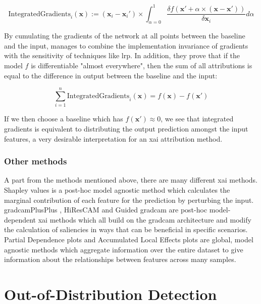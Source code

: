 \documentclass[UKenglish]{uiomasterthesis} %
\theoremstyle{definition}
\begin{document}
\begin{equation}
    \text{IntegratedGradients}_i(\mathbf{x}) := (\mathbf{x}_i - \mathbf{x}_i') \times \int_{\alpha = 0}^1 \frac{\delta f(\mathbf{x}' + \alpha \times (\mathbf{x} - \mathbf{x}'))}{\delta \mathbf{x}_i}d\alpha
\end{equation}

By cumulating the gradients of the network at all points between the baseline and the input, \cite{integratedgradients} manages to combine the implementation invariance of gradients with the sensitivity of techniques like \ac{lrp}. In addition, they prove that if the model $f$ is differentiable "almost everywhere", then the sum of all attributions is equal to the difference in output between the baseline and the input:

\begin{equation}
    \sum_{i=1}^n \text{IntegratedGradients}_i(\mathbf{x}) = f(\mathbf{x}) - f(\mathbf{x'})
\end{equation}

If we then choose a baseline which has $f(\mathbf{x'}) \approx 0$, we see that integrated gradients is equivalent to distributing the output prediction amongst the input features, a very desirable interpretation for an \ac{xai} attribution method.

\subsubsection{Other methods}

A part from the methods mentioned above, there are many different \ac{xai} methods. Shapley values \cite{shapley} is a post-hoc model agnostic method which calculates the marginal contribution of each feature for the prediction by perturbing the input. \ac{gradcam}PlusPlus \cite{gradcamplusplus}, HiResCAM \cite{hirescam} and Guided \ac{gradcam} \cite{gradcam} are post-hoc model-dependent \ac{xai} methods which all build on the \ac{gradcam} architecture and modify the calculation of saliencies in ways that can be beneficial in specific scenarios. Partial Dependence plots \cite{pdp} and Accumulated Local Effects plots \cite{ale} are global, model agnostic methods which aggregate information over the entire dataset to give information about the relationships between features across many samples. %


\section{Out-of-Distribution Detection} \label{ood_intro}
\end{document}
